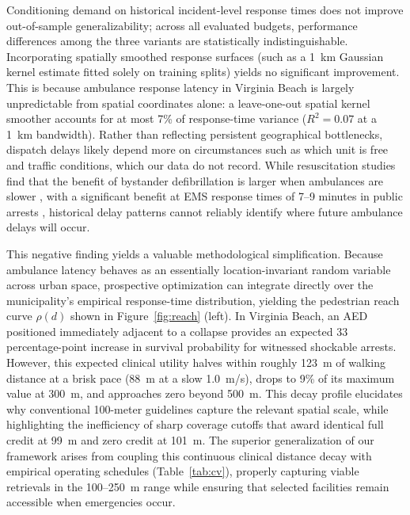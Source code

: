 \documentclass[11pt]{article}
\begin{document}
Conditioning demand on historical incident-level response times does not improve out-of-sample generalizability; across all evaluated budgets, performance differences among the three variants are statistically indistinguishable. Incorporating spatially smoothed response surfaces (such as a 1~km Gaussian kernel estimate fitted solely on training splits) yields no significant improvement. This is because ambulance response latency in Virginia Beach is largely unpredictable from spatial coordinates alone: a leave-one-out spatial kernel smoother accounts for at most 7\% of response-time variance ($R^2=0.07$ at a 1~km bandwidth). Rather than reflecting persistent geographical bottlenecks, dispatch delays likely depend more on circumstances such as which unit is free and traffic conditions, which our data do not record. While resuscitation studies find that the benefit of bystander defibrillation is larger when ambulances are slower \cite{pollack2018}, with a significant benefit at EMS response times of 7--9 minutes in public arrests \cite{hindborg2025}, historical delay patterns cannot reliably identify where future ambulance delays will occur.

This negative finding yields a valuable methodological simplification. Because ambulance latency behaves as an essentially location-invariant random variable across urban space, prospective optimization can integrate directly over the municipality's empirical response-time distribution, yielding the pedestrian reach curve $\rho(d)$ shown in Figure~\ref{fig:reach} (left). In Virginia Beach, an AED positioned immediately adjacent to a collapse provides an expected 33 percentage-point increase in survival probability for witnessed shockable arrests. However, this expected clinical utility halves within roughly 123~m of walking distance at a brisk pace (88~m at a slow 1.0~m/s), drops to 9\% of its maximum value at 300~m, and approaches zero beyond 500~m. This decay profile elucidates why conventional 100-meter guidelines capture the relevant spatial scale, while highlighting the inefficiency of sharp coverage cutoffs that award identical full credit at 99~m and zero credit at 101~m. The superior generalization of our framework arises from coupling this continuous clinical distance decay with empirical operating schedules (Table~\ref{tab:cv}), properly capturing viable retrievals in the 100--250~m range while ensuring that selected facilities remain accessible when emergencies occur.
\end{document}
